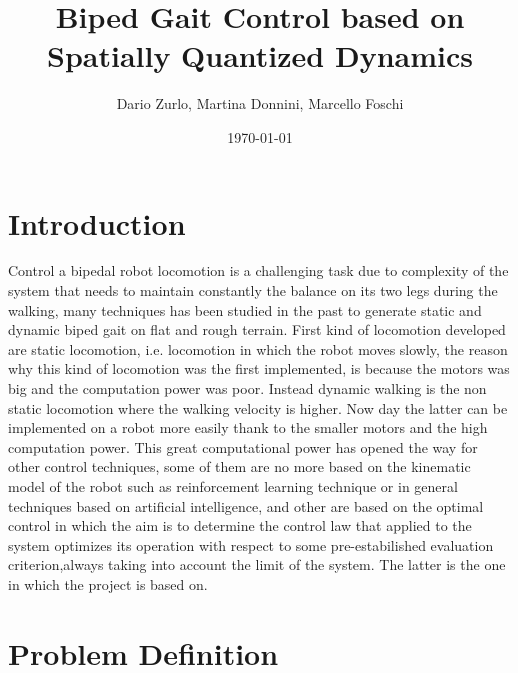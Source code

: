 \documentclass[a4paper]{article}
\title{Biped Gait Control based on Spatially Quantized Dynamics}
\author{Dario Zurlo, Martina Donnini, Marcello Foschi}
\date{\today}
\begin{document}
\maketitle

\newpage

\section{Introduction}

Control a bipedal robot locomotion is a challenging task due to complexity of the system that needs to maintain constantly the balance on its two legs during the walking, many techniques has been studied in the past to generate static and dynamic biped gait on flat and rough terrain. First kind of locomotion developed are static locomotion, i.e. locomotion in which the robot moves slowly, the reason why this kind of locomotion was the first implemented, is because the motors was big and the computation power was poor. Instead dynamic walking is the non static locomotion where the walking velocity is higher. Now day the latter can be implemented on a robot more easily thank to the smaller motors and the high computation power. This great computational power has opened the way for other control techniques, some of them are no more based on the kinematic model of the robot such as reinforcement learning technique or in general techniques based on artificial intelligence, and other are based on the optimal control in which the aim is to determine the control law that applied to the system optimizes its operation with respect to some pre-estabilished evaluation criterion,always taking into account the limit of the system. The latter is the one in which the project is based on.

\section{Problem Definition}
\end{document}

